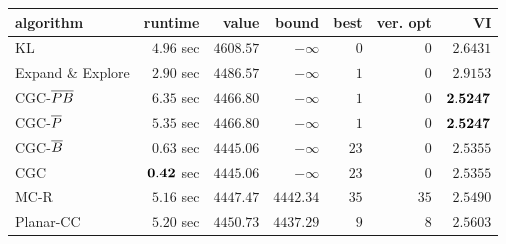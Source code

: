 \begin{table}
\scriptsize
\centering
\label{tab:experiments-andres-2d}
\begin{tabular}{lrrrrrr}
\toprule
           algorithm &         runtime       &           value &           bound &       best &   ver. opt&              VI  \\\midrule %
                  KL & $         4.96$ sec & $      4608.57$ & $      -\infty$ & $       0$ & $       0$  & $       2.6431$  \\ %
        Expand \& Explore & $         2.90$ sec & $      4486.57$ & $      -\infty$ & $       1$ & $       0$  & $       2.9153$  \\ %
       CGC-${\overline{PB}}$ & $       6.35$ sec & $      4466.80$ & $      -\infty$ & $       1$ & $       0$  & $   {\bf2.5247}$   \\ %
        CGC-${\overline{P}}$ & $       5.35$ sec & $      4466.80$ & $      -\infty$ & $       1$ & $       0$  & $   {\bf2.5247}$   \\ %
        CGC-${\overline{B}}$ & $       0.63$ sec & $      4445.06$ & $      -\infty$ & $      23$ & $       0$  & $       2.5355$   \\ %
                 CGC & $    {\bf0.42}$ sec & $      4445.06$ & $      -\infty$ & $      23$ & $       0$  & $       2.5355$   \\ %
\cmidrule{1-1}                                                                                                             
                MC-R & $         5.16$ sec & $      4447.47$ & $      4442.34$ & $      35$ & $      35$  & $       2.5490$  \\ %
           Planar-CC & $         5.20$ sec & $      4450.73$ & $      4437.29$ & $       9$ & $       8$  & $       2.5603$  \\ %

\end{tabular}
\end{table}
